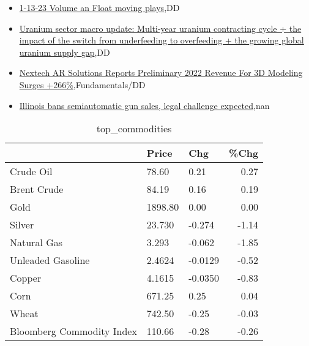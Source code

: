 \documentclass{article}%
\begin{document}
%
\begin{itemize}%
\item%
\href{https://reddit.com/r/wallstreetbets/comments/10atklw/11323\_volume\_an\_float\_moving\_plays/}{1-13-23 Volume an Float moving plays},DD%
\item%
\href{https://reddit.com/r/Baystreetbets/comments/10arp5o/uranium\_sector\_macro\_update\_multiyear\_uranium/}{Uranium sector macro update: Multi-year uranium contracting cycle + the impact of the switch from underfeeding to overfeeding + the growing global uranium supply gap},DD%
\item%
\href{https://reddit.com/r/StockMarket/comments/10arxtb/nextech\_ar\_solutions\_reports\_preliminary\_2022/}{Nextech AR Solutions Reports Preliminary 2022 Revenue For 3D Modeling Surges +266\%},Fundamentals/DD%
\item%
\href{https://reddit.com/r/Economics/comments/10aqgkm/illinois\_bans\_semiautomatic\_gun\_sales\_legal/}{Illinois bans semiautomatic gun sales, legal challenge expected},nan%
\end{itemize}%


\begin{table}[htbp]%
\caption{top\_commodities}%
\centering%
\begin{adjustbox}{width=1\textwidth}%
\begin{tabular}{lllr}
\toprule
                          &   Price &     Chg &  \%Chg \\
\midrule
               Crude Oil  &   78.60 &    0.21 &  0.27 \\
             Brent Crude  &   84.19 &    0.16 &  0.19 \\
                    Gold  & 1898.80 &    0.00 &  0.00 \\
                  Silver  &  23.730 &  -0.274 & -1.14 \\
             Natural Gas  &   3.293 &  -0.062 & -1.85 \\
       Unleaded Gasoline  &  2.4624 & -0.0129 & -0.52 \\
                  Copper  &  4.1615 & -0.0350 & -0.83 \\
                    Corn  &  671.25 &    0.25 &  0.04 \\
                   Wheat  &  742.50 &   -0.25 & -0.03 \\
Bloomberg Commodity Index &  110.66 &   -0.28 & -0.26 \\
\bottomrule
\end{tabular}
%
\end{adjustbox}%
\end{table}
\end{document}
